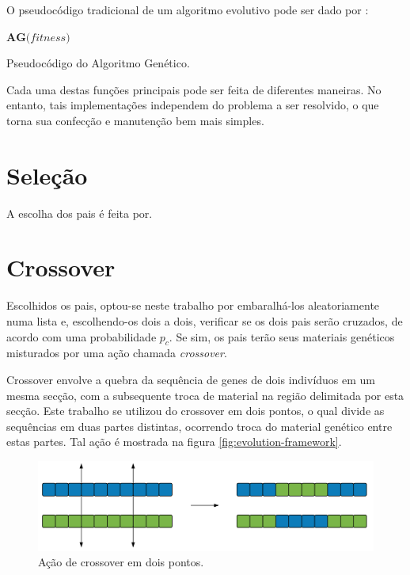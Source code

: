 \label{3_algoritmo_genetico}

O pseudocódigo tradicional de um algoritmo evolutivo pode ser dado por \cite{algoritmopseudo}:

\begin{algorithm}[H]
$\textbf{AG(} fitness \textbf{)}$
\caption{Pseudocódigo do Algoritmo Genético.}
\label{alg:ag}
\end{algorithm}

Cada uma destas funções principais pode ser feita de diferentes maneiras. No entanto, tais implementações independem do problema a ser resolvido, o que torna sua confecção e manutenção bem mais simples.

\section{Seleção}

A escolha dos pais é feita por.

\section{Crossover}

Escolhidos os pais, optou-se neste trabalho por embaralhá-los aleatoriamente numa lista e, escolhendo-os dois a dois, verificar se os dois pais serão cruzados, de acordo com uma probabilidade $p_c$. Se sim, os pais terão seus materiais genéticos misturados por uma ação chamada \emph{crossover}.

Crossover envolve a quebra da sequência de genes de dois indivíduos em um mesma secção, com a subsequente troca de material na região delimitada por esta secção. Este trabalho se utilizou do crossover em dois pontos, o qual divide as sequências em duas partes distintas, ocorrendo troca do material genético entre estas partes. Tal ação é mostrada na figura \ref{fig:evolution-framework}.

\begin{figure}[ht!]
    \centering \includegraphics[width=1.0\textwidth]{crossover.png}
    \caption{Ação de crossover em dois pontos.}
    \label{fig:crossover}
\end{figure}

